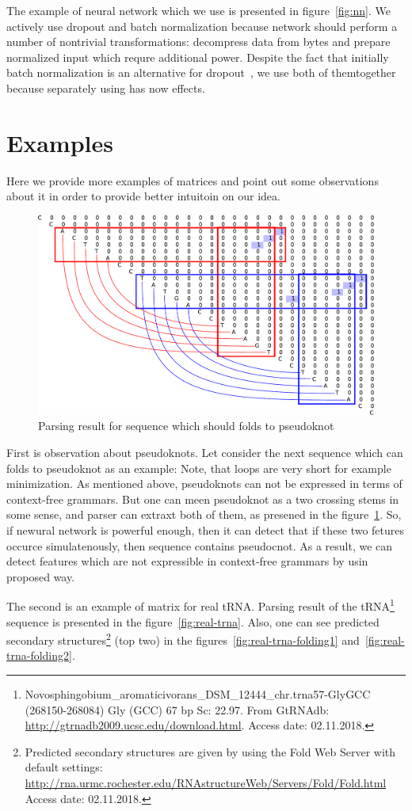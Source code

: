 \documentclass[a4paper,twoside]{article}
\begin{document}
The example of neural network which we use is presented in figure~\ref{fig:nn}.
We actively use dropout and batch normalization because network should perform a number of nontrivial transformations: decompress data from bytes and  prepare normalized input which requre additional power.
Despite the fact that initially batch normalization is an alternative for dropout~\cite{DBLP:journals:corr:IoffeS15}, we use both of themtogether because separately using has now effects.

\section{Examples}
\label{sec:examples}

\noindent Here we provide more examples of matrices and point out some observations about it in order to provide better intuitoin on our idea.

\begin{figure}
\centering
\includegraphics[width=.45\textwidth]{figures/5.pdf}
\caption{Parsing result for sequence which should folds to pseudoknot}
\label{fig:pseudoknot}
\end{figure}

First is observation about pseudoknots. 
Let consider the next sequence which can folds to pseudoknot as an example: {}
Note, that loops are very short for example minimization.
As mentioned above, pseudoknots can not be expressed in terms of context-free grammars. 
But one can meen pseudoknot as a two crossing stems in some sense, and parser can extraxt both of them, as presened in the figure~\ref{fig:pseudoknot}.
So, if newural network is powerful enough, then it can detect that if these two fetures occurce simulatenously, then sequence contains pseudocnot.
As a result, we can detect features which are not expressible in context-free grammars by usin proposed way.

The second is an example of matrix for real tRNA.
Parsing result of the tRNA\footnote{Novosphingobium\_aromaticivorans\_DSM\_12444\_chr.trna57-GlyGCC (268150-268084)  Gly (GCC) 67 bp Sc: 22.97. From GtRNAdb: \url{http://gtrnadb2009.ucsc.edu/download.html}. Access date: 02.11.2018.} sequence {} is presented in the figure~\ref{fig:real-trna}. Also, one can see predicted secondary structures\footnote{Predicted secondary structures are given by using the Fold Web Server with default settings: \url{http://rna.urmc.rochester.edu/RNAstructureWeb/Servers/Fold/Fold.html} Access date: 02.11.2018.} (top two) in the figures~\ref{fig:real-trna-folding1} and~\ref{fig:real-trna-folding2}.
\end{document}
